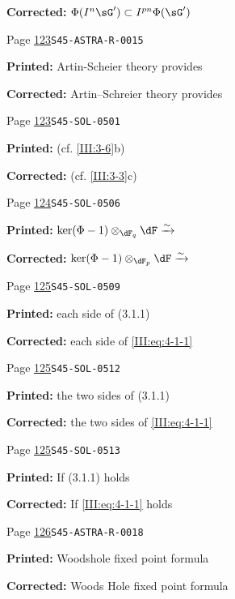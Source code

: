 \documentclass[oneside]{book}
\newcommand{\iso}{\xrightarrow\sim}
\theoremstyle{sga-source}
\theoremstyle{sga-source-dash}
\theoremstyle{sga-source-dotdash}
\theoremstyle{sga-source-number-note-dash}
\theoremstyle{sga-source-note-number-dotdash}
\theoremstyle{sga-source-example-dotdash}
\theoremstyle{sga-source-inline-number}
\theoremstyle{sga-source-bare-number}
\theoremstyle{sga-source}
\begin{document}
\begin{description}
\par\noindent\textbf{Corrected:} \(\Phi(I^n \sG')\subset I^{p n}\Phi(\sG')\)
\smallskip
\item[\hypertarget{apparatus:EN-0057}{57}] Page \hyperlink{printpage:en:123}{123}\quad\texttt{S45-ASTRA-R-0015}
\par\noindent\textbf{Printed:} Artin-Scheier theory provides
\par\noindent\textbf{Corrected:} Artin--Schreier theory provides
\smallskip
\item[\hypertarget{apparatus:EN-0058}{58}] Page \hyperlink{printpage:en:123}{123}\quad\texttt{S45-SOL-0501}
\par\noindent\textbf{Printed:} (cf. \ref{III:3-6}b)
\par\noindent\textbf{Corrected:} (cf. \ref{III:3-3}c)
\smallskip
\item[\hypertarget{apparatus:EN-0059}{59}] Page \hyperlink{printpage:en:124}{124}\quad\texttt{S45-SOL-0506}
\par\noindent\textbf{Printed:} \(\ker(\Phi-1)\otimes_{\dF_q}\dF \iso\)
\par\noindent\textbf{Corrected:} \(\ker(\Phi-1)\otimes_{\dF_p}\dF \iso\)
\smallskip
\item[\hypertarget{apparatus:EN-0060}{60}] Page \hyperlink{printpage:en:125}{125}\quad\texttt{S45-SOL-0509}
\par\noindent\textbf{Printed:} each side of (3.1.1)
\par\noindent\textbf{Corrected:} each side of \eqref{III:eq:4-1-1}
\smallskip
\item[\hypertarget{apparatus:EN-0061}{61}] Page \hyperlink{printpage:en:125}{125}\quad\texttt{S45-SOL-0512}
\par\noindent\textbf{Printed:} the two sides of (3.1.1)
\par\noindent\textbf{Corrected:} the two sides of \eqref{III:eq:4-1-1}
\smallskip
\item[\hypertarget{apparatus:EN-0062}{62}] Page \hyperlink{printpage:en:125}{125}\quad\texttt{S45-SOL-0513}
\par\noindent\textbf{Printed:} If (3.1.1) holds
\par\noindent\textbf{Corrected:} If \eqref{III:eq:4-1-1} holds
\smallskip
\item[\hypertarget{apparatus:EN-0063}{63}] Page \hyperlink{printpage:en:126}{126}\quad\texttt{S45-ASTRA-R-0018}
\par\noindent\textbf{Printed:} Woodshole fixed point formula
\par\noindent\textbf{Corrected:} Woods Hole fixed point formula

\end{description}
\end{document}
